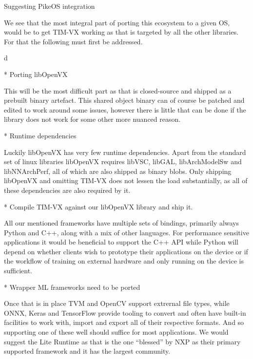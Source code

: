 \chap Suggesting PikeOS integration

We see that the most integral part of
porting this ecosystem to a given OS,
would be to get TIM-VX working as
that is targeted by all the other
libraries.
For that the following must first be addressed.

\begitems \style d

* {Porting libOpenVX}

This will be the most difficult part
as that is closed-source and shipped as a prebuilt
binary artefact.
This shared object binary can of course be patched
and edited to work around some issues,
however there is little that can be done
if the library does not work
for some other more nuanced reason.

* {Runtime dependencies}

Luckily libOpenVX has very few runtime dependencies.
Apart from the standard set of linux libraries
libOpenVX requires libVSC, libGAL, libArchModelSw and libNNArchPerf,
all of which are also shipped as binary blobs.
Only shipping libOpenVX and omitting TIM-VX
does not lessen the load substantially,
as all of these dependencies are also required by it.

* {Compile TIM-VX against our libOpenVX library and ship it.}

All our mentioned frameworks have multiple sets of bindings,
primarily always Python and C++, along with a mix of other languages.
For performance sensitive applications it would be beneficial
to support the C++ API while Python will depend on
whether clients wish to prototype their applications
on the device or if the workflow
of training on external hardware and only running on the device
is sufficient.

* {Wrapper ML frameworks need to be ported}

Once that is in place TVM and OpenCV support extrernal
file types,
while ONNX, Keras and TensorFlow
provide tooling to convert and
often have built-in facilities to work with,
import and export
all of their respective formats.
And so supporting one of these well should
suffice for most applications.
We would suggest the Lite Runtime as that is the one ``blessed''
by NXP as their primary supported framework
and it has the largest community.

\enditems


